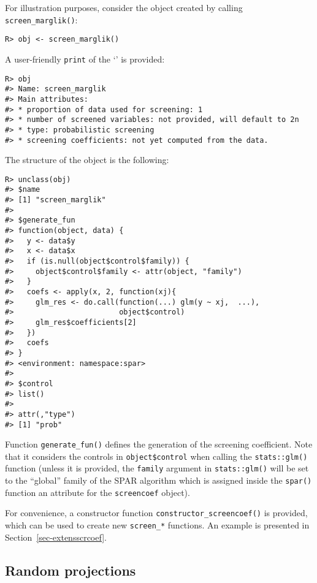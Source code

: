 \documentclass[
  article]{jss}
\newcommand{\class}[1]{`\code{#1}'}
\begin{document}
For illustration purposes, consider the object created by calling
\texttt{screen\_marglik()}:

\begin{verbatim}
R> obj <- screen_marglik()
\end{verbatim}

A user-friendly \texttt{print} of the \class{screencoef} is provided:

\begin{verbatim}
R> obj
#> Name: screen_marglik 
#> Main attributes: 
#> * proportion of data used for screening: 1 
#> * number of screened variables: not provided, will default to 2n 
#> * type: probabilistic screening 
#> * screening coefficients: not yet computed from the data.
\end{verbatim}

The structure of the object is the following:

\begin{verbatim}
R> unclass(obj)
#> $name
#> [1] "screen_marglik"
#> 
#> $generate_fun
#> function(object, data) {
#>   y <- data$y
#>   x <- data$x
#>   if (is.null(object$control$family)) {
#>     object$control$family <- attr(object, "family")
#>   }
#>   coefs <- apply(x, 2, function(xj){
#>     glm_res <- do.call(function(...) glm(y ~ xj,  ...),
#>                        object$control)
#>     glm_res$coefficients[2]
#>   })
#>   coefs
#> }
#> <environment: namespace:spar>
#> 
#> $control
#> list()
#> 
#> attr(,"type")
#> [1] "prob"
\end{verbatim}

Function \texttt{generate\_fun()} defines the generation of the
screening coefficient. Note that it considers the controls in
\texttt{object\$control} when calling the \texttt{stats::glm()} function
(unless it is provided, the \texttt{family} argument in
\texttt{stats::glm()} will be set to the ``global'' family of the SPAR
algorithm which is assigned inside the \texttt{spar()} function an
attribute for the \texttt{screencoef} object).

For convenience, a constructor function
\texttt{constructor\_screencoef()} is provided, which can be used to
create new \texttt{screen\_*} functions. An example is presented in
Section~\ref{sec-extensscrcoef}.

\subsection{Random projections}\label{random-projections}
\end{document}
